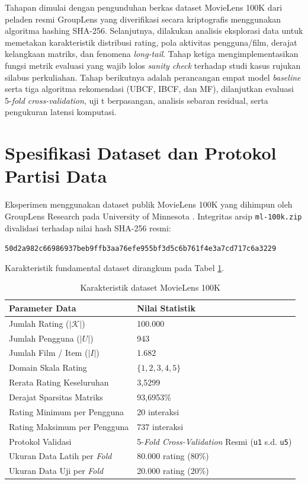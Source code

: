 Tahapan dimulai dengan pengunduhan berkas dataset MovieLens 100K dari peladen resmi GroupLens yang diverifikasi secara kriptografis menggunakan algoritma hashing SHA-256. Selanjutnya, dilakukan analisis eksplorasi data untuk memetakan karakteristik distribusi rating, pola aktivitas pengguna/film, derajat kelangkaan matriks, dan fenomena \textit{long-tail}. Tahap ketiga mengimplementasikan fungsi metrik evaluasi yang wajib lolos \textit{sanity check} terhadap studi kasus rujukan silabus perkuliahan. Tahap berikutnya adalah perancangan empat model \textit{baseline} serta tiga algoritma rekomendasi (UBCF, IBCF, dan MF), dilanjutkan evaluasi 5-\textit{fold cross-validation}, uji t berpasangan, analisis sebaran residual, serta pengukuran latensi komputasi.

\section{Spesifikasi Dataset dan Protokol Partisi Data}
Eksperimen menggunakan dataset publik MovieLens 100K yang dihimpun oleh GroupLens Research pada University of Minnesota \citep{harper2015movielens}. Integritas arsip \texttt{ml-100k.zip} divalidasi terhadap nilai hash SHA-256 resmi:
\begin{center}
{\footnotesize\texttt{50d2a982c66986937beb9ffb3aa76efe955bf3d5c6b761f4e3a7cd717c6a3229}}
\end{center}
Karakteristik fundamental dataset dirangkum pada Tabel \ref{tab:karakteristik_dataset}.

\begin{table}[htbp]
\centering
\caption{Karakteristik dataset MovieLens 100K}
\label{tab:karakteristik_dataset}
\small
\begin{tabular}{l l}
\toprule
\textbf{Parameter Data} & \textbf{Nilai Statistik} \\
\midrule
Jumlah Rating ($|\mathcal{K}|$) & 100.000 \\
Jumlah Pengguna ($|U|$) & 943 \\
Jumlah Film / Item ($|I|$) & 1.682 \\
Domain Skala Rating & $\{1, 2, 3, 4, 5\}$ \\
Rerata Rating Keseluruhan & 3,5299 \\
Derajat Sparsitas Matriks & 93,6953\% \\
Rating Minimum per Pengguna & 20 interaksi \\
Rating Maksimum per Pengguna & 737 interaksi \\
Protokol Validasi & 5-\textit{Fold Cross-Validation} Resmi (\texttt{u1} s.d. \texttt{u5}) \\
Ukuran Data Latih per \textit{Fold} & 80.000 rating (80\%) \\
Ukuran Data Uji per \textit{Fold} & 20.000 rating (20\%) \\
\bottomrule
\end{tabular}
\end{table}

